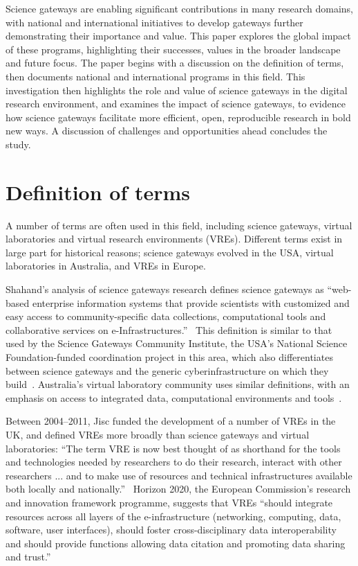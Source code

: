 \documentclass[review]{elsarticle}
\begin{document}
Science gateways are enabling significant contributions in many research domains, with national and international initiatives to develop gateways further demonstrating their importance and value. This paper explores the global impact of these programs, highlighting their successes, values in the broader landscape and future focus. The paper begins with a discussion on the definition of terms, then documents national and international programs in this field. This investigation then highlights the role and value of science gateways in the digital research environment, and examines the impact of science gateways, to evidence how science gateways facilitate more efficient, open, reproducible research in bold new ways. A discussion of challenges and opportunities ahead concludes the study. 

\section{Definition of terms}

A number of terms are often used in this field, including science gateways, virtual laboratories and virtual research environments (VREs). Different terms exist in large part for historical reasons; science gateways evolved in the USA, virtual laboratories in Australia, and VREs in Europe. 

Shahand's analysis of science gateways research defines science gateways as ``web-based enterprise information systems that provide scientists with customized and easy access to community-specific data collections, computational tools and collaborative services on e-Infrastructures.''~\cite{shahand2015-1} This definition is similar to that used by the Science Gateways Community Institute, the USA's National Science Foundation-funded coordination project in this area, which also differentiates between science gateways and the generic cyberinfrastructure on which they build~\cite{what-is-sg-2}. Australia's virtual laboratory community uses similar definitions, with an emphasis on access to integrated data, computational environments and tools~\cite{nectar-impact-3}. 

Between 2004--2011, Jisc funded the development of a number of VREs in the UK, and defined VREs more broadly than science gateways and virtual laboratories: ``The term VRE is now best thought of as shorthand for the tools and technologies needed by researchers to do their research, interact with other researchers ... and to make use of resources and technical infrastructures available both locally and nationally.''~\cite{jisc-vre-4} Horizon 2020, the European Commission's research and innovation framework programme, suggests that VREs ``should integrate resources across all layers of the e-infrastructure (networking, computing, data, software, user interfaces), should foster cross-disciplinary data interoperability and should provide functions allowing data citation and promoting data sharing and trust.''~\cite{h2020-vre-5} 
\end{document}
